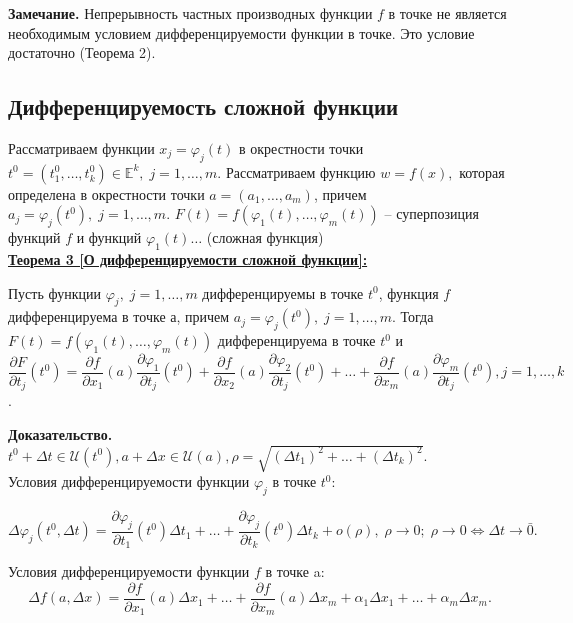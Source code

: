 \documentclass[a4paper,12pt]{article} %
\begin{document}
 \textbf{Замечание.} Непрерывность частных производных функции $f$ в точке не является необходимым условием дифференцируемости функции в точке. Это условие достаточно (Теорема 2).\\
	 
 \subsection{Дифференцируемость сложной функции}
 
 Рассматриваем функции $x_j = \varphi_j(t)$ в окрестности точки $t^0 = (t_1^0, \ldots, t_k^0)\in \mathds{E}^k, \; j = 1, \ldots, m$. Рассматриваем функцию $w = f(x),$ которая определена в окрестности точки $a = (a_1, \ldots, a_m)$, причем $a_j = \varphi_j(t^0), \; j = 1, \ldots, m$. $F(t) = f(\varphi_1(t), \ldots, \varphi_m(t))$ -- суперпозиция функций $f$ и функций $\varphi_1(t) \ldots$ (сложная функция)\\
 
 \underline{\textbf{Теорема 3 [О дифференцируемости сложной функции]:}}
 
 Пусть функции $\varphi_j, \; j = 1, \ldots, m$ дифференцируемы в точке $t^0$, функция $f$ дифференцируема в точке $а$, причем $a_j = \varphi_j(t^0), \; j = 1, \ldots,m$. Тогда $F(t) = f(\varphi_1(t), \ldots, \varphi_m(t))$ дифференцируема в точке $t^0$ и 
 \[\frac{\partial F}{\partial t_j}(t^0) = \frac{\partial f}{\partial x_1}(a) \frac{\partial \varphi_1}{\partial t_j}(t^0	) + \frac{\partial f}{\partial x_2}(a) \frac{\partial \varphi_2}{\partial t_j}(t^0	) + \ldots + \frac{\partial f}{\partial x_m}(a) \frac{\partial \varphi_m}{\partial t_j}(t^0), j = 1, \ldots, k\].
	 
 \textbf{Доказательство.} $t^0 + \Delta t \in \mathscr{U}(t^0), a + \Delta x \in \mathscr{U}(a), \rho = \sqrt{(\Delta t_1)^2 + \ldots + (\Delta t_k)^2}$.\\
 
 Условия дифференцируемости функции $\varphi_j$ в точке $t^0$:
 
  \[\Delta \varphi_j(t^0, \Delta t) = \frac{\partial \varphi_j}{\partial t_1}(t^0)\Delta t_1 + \ldots + \frac{\partial \varphi_j}{\partial t_k}(t^0)\Delta t_k + o(\rho), \; \rho \to 0; \; \rho \to 0 \Leftrightarrow \Delta t \to \bar0.\]
  
 Условия дифференцируемости функции $f$ в точке a:
 \[\Delta f(a, \Delta x) = \frac {\partial f}{\partial x_1}(a)\Delta x_1 + \ldots + \frac {\partial f}{\partial x_m}(a)\Delta x_m + \alpha_1 \Delta x_1 + \ldots + \alpha_m \Delta x_m.\]
 
\end{document}

